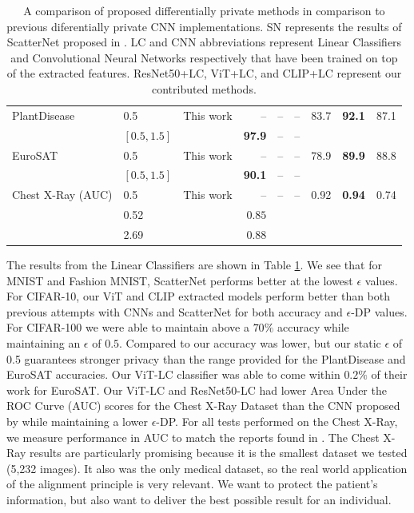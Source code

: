 \documentclass{article}
\theoremstyle{definition}
\begin{document}
\begin{table}[ht!]
\begin{tabular}{@{} l l l r r r r r r@{}}
		\multirow{1}{5em}{PlantDisease}
		&0.5 & This work & -- & -- & -- & 83.7 & \bf{92.1} & 87.1 \\
		&$[0.5, 1.5]$ & \citet{luo2021scalable} & \bf{97.9} & -- & -- & & &  \\
        \midrule
        
		\multirow{1}{5em}{EuroSAT}
		&0.5 & This work & -- & -- & -- & 78.9 & \bf{89.9} & 88.8 \\
		&$[0.5, 1.5]$ & \citet{luo2021scalable} & \bf{90.1} & -- & -- & & &  \\
		\midrule	
		
		\multirow{1}{5em}{Chest X-Ray (AUC)}
		&0.5 & This work & -- & -- & -- & 0.92 & \bf{0.94} & 0.74 \\
		&0.52 & \citet{ziller2021medical} & $0.85$ \\
		&2.69 & \citet{ziller2021medical} & $0.88$ \\
		\bottomrule
	\end{tabular}
	\caption{A comparison of proposed differentially private methods in comparison to previous diferentially private CNN implementations. SN represents the results of ScatterNet proposed in \citet{tramer2020differentially}. LC and CNN abbreviations represent Linear Classifiers and Convolutional Neural Networks respectively that have been trained on top of the extracted features. ResNet50+LC, ViT+LC, and CLIP+LC represent our contributed methods.}
	\label{tab:results}
\end{table}

The results from the Linear Classifiers are shown in Table \ref{tab:results}. We see that for MNIST and Fashion MNIST, ScatterNet performs better at the lowest $\epsilon$ values. For CIFAR-10, our ViT and CLIP extracted models perform better than both previous attempts with CNNs and ScatterNet for both accuracy and $\epsilon$-DP values. For CIFAR-100 we were able to maintain above a $70\%$ accuracy while maintaining an $\epsilon$ of $0.5$. Compared to \cite{luo2021scalable} our accuracy was lower, but our static $\epsilon$ of 0.5 guarantees stronger privacy than the range provided for the PlantDisease and EuroSAT accuracies. Our ViT-LC classifier was able to come within $0.2\%$ of their work for EuroSAT. Our ViT-LC and ResNet50-LC had lower Area Under the ROC Curve (AUC) scores for the Chest X-Ray Dataset than the CNN proposed by \cite{ziller2021medical} while maintaining a lower $\epsilon$-DP. For all tests performed on the Chest X-Ray, we measure performance in AUC to match the reports found in \cite{ziller2021medical}. The Chest X-Ray results are particularly promising because it is the smallest dataset we tested (5,232 images). It also was the only medical dataset, so the real world application of the alignment principle is very relevant. We want to protect the patient's information, but also want to deliver the best possible result for an individual.
\end{document}
